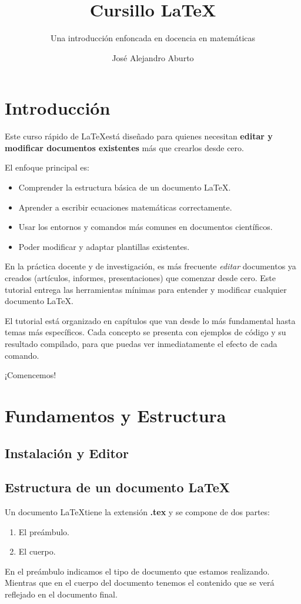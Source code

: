\documentclass[graybox,envcountchap,sectrefs]{svmono}
\begin{document}
\author{José Alejandro Aburto}
\title{Cursillo \LaTeX}
\subtitle{Una introducción enfoncada en docencia en matemáticas}
\maketitle
\tableofcontents
\chapter*{Introducción}
Este curso rápido de \LaTeX está diseñado para quienes necesitan \textbf{editar y modificar documentos existentes} más que crearlos desde cero.

El enfoque principal es:
\begin{itemize}
    \item Comprender la estructura básica de un documento \LaTeX.
    \item Aprender a escribir ecuaciones matemáticas correctamente.
    \item Usar los entornos y comandos más comunes en documentos científicos.
    \item Poder modificar y adaptar plantillas existentes.
\end{itemize}

En la práctica docente y de investigación, es más frecuente \emph{editar} documentos ya creados (artículos, informes, presentaciones) que comenzar desde cero. Este tutorial entrega las herramientas mínimas para entender y modificar cualquier documento \LaTeX.

El tutorial está organizado en capítulos que van desde lo más fundamental hasta temas más específicos. Cada concepto se presenta con ejemplos de código y su resultado compilado, para que puedas ver inmediatamente el efecto de cada comando.

¡Comencemos!

\chapter{Fundamentos y Estructura}
\section{Instalación y Editor}
\section{Estructura de un documento \LaTeX}
Un documento \LaTeX tiene la extensión \textbf{.tex}
y se compone de dos partes:
    \begin{enumerate}
        \item El preámbulo.
        \item El cuerpo.
    \end{enumerate}
    En el preámbulo indicamos el tipo de documento que estamos realizando. 
    Mientras que en el cuerpo del documento tenemos el contenido que se verá reflejado en el documento final.
\end{document}
